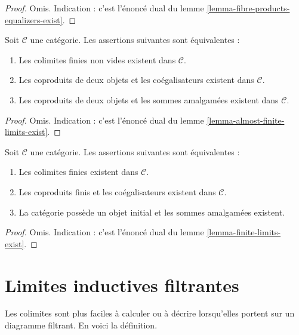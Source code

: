 \begin{proof}
Omis. Indication : c'est l'énoncé dual du
lemme \ref{lemma-fibre-products-equalizers-exist}.
\end{proof}

\begin{lemma}
\label{lemma-almost-finite-colimits-exist}
Soit $\mathcal{C}$ une catégorie.
Les assertions suivantes sont équivalentes :
\begin{enumerate}
\item Les colimites finies non vides existent dans $\mathcal{C}$.
\item Les coproduits de deux objets et les coégalisateurs existent dans
$\mathcal{C}$.
\item Les coproduits de deux objets et les sommes amalgamées existent dans
$\mathcal{C}$.
\end{enumerate}
\end{lemma}

\begin{proof}
Omis. Indication : c'est l'énoncé dual du
lemme \ref{lemma-almost-finite-limits-exist}.
\end{proof}

\begin{lemma}
\label{lemma-colimits-exist}
Soit $\mathcal{C}$ une catégorie.
Les assertions suivantes sont équivalentes :
\begin{enumerate}
\item Les colimites finies existent dans $\mathcal{C}$.
\item Les coproduits finis et les coégalisateurs existent dans $\mathcal{C}$.
\item La catégorie possède un objet initial et les sommes amalgamées existent.
\end{enumerate}
\end{lemma}

\begin{proof}
Omis. Indication : c'est l'énoncé dual du
lemme \ref{lemma-finite-limits-exist}.
\end{proof}





\section{Limites inductives filtrantes}
\label{section-directed-colimits}

\noindent
Les colimites sont plus faciles à calculer ou à décrire lorsqu'elles
portent sur un diagramme filtrant. En voici la définition.

